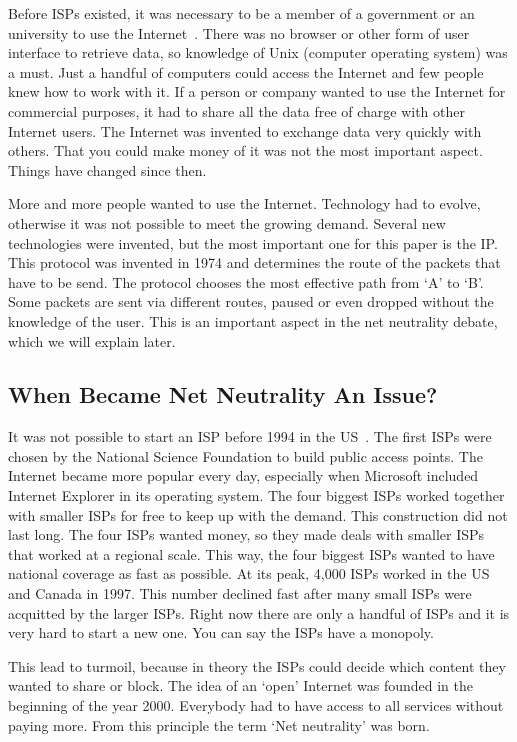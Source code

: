 Before \acp{ISP} existed, it was necessary to be a member of a government or an university to use the Internet~\cite{historyisp}. There was no browser or other form of user interface to retrieve data, so knowledge of Unix (computer operating system) was a must. Just a handful of computers could access the Internet and few people knew how to work with it. If a person or company wanted to use the Internet for commercial purposes, it had to share all the data free of charge with other Internet users. The Internet was invented to exchange data very quickly with others. That you could make money of it was not the most important aspect. Things have changed since then.

More and more people wanted to use the Internet. Technology had to evolve, otherwise it was not possible to meet the growing demand. Several new technologies were invented, but the most important one for this paper is the \acf{IP}. This protocol was invented in 1974 and determines the route of the packets that have to be send. The protocol chooses the most effective path from `A' to `B'. Some packets are sent via different routes, paused or even dropped without the knowledge of the user. This is an important aspect in the net neutrality debate, which we will explain later.

\subsection{When Became Net Neutrality An Issue?}
It was not possible to start an \ac{ISP} before 1994 in the US~\cite{historyisp}. The first \acp{ISP} were chosen by the National Science Foundation to build public access points. The Internet became more popular every day, especially when Microsoft included Internet Explorer in its operating system. The four biggest \acp{ISP} worked together with smaller \acp{ISP} for free to keep up with the demand. This construction did not last long. The four \acp{ISP} wanted money, so they made deals with smaller \acp{ISP} that worked at a regional scale. This way, the four biggest \acp{ISP} wanted to have national coverage as fast as possible. At its peak, 4,000 \acp{ISP} worked in the US and Canada in 1997. This number declined fast after many small \acp{ISP} were acquitted by the larger \acp{ISP}. Right now there are only a handful of \acp{ISP} and it is very hard to start a new one. You can say the \acp{ISP} have a monopoly.

This lead to turmoil, because in theory the \acp{ISP} could decide which content they wanted to share or block. The idea of an `open' Internet was founded in the beginning of the year 2000. Everybody had to have access to all services without paying more. From this principle the term `Net neutrality' was born.